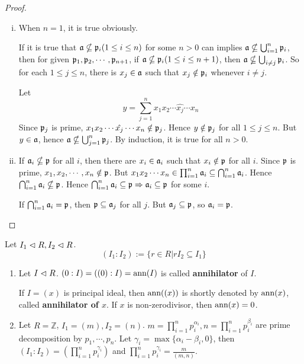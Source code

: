 \documentclass{amsart}
\begin{document}
\begin{proof}
	\begin{enumerate}[(i)]
		\item When $n=1$, it is true obviously.
		
		If it is true that $\mathfrak{a} \nsubseteq \mathfrak{p}_i(1 \leq i \leq n)$ for some $n > 0$ can implies $\mathfrak{a} \nsubseteq \bigcup_{i=1}^{n} \mathfrak{p}_i$, then for given $\mathfrak{p}_1, \mathfrak{p}_2, \cdots, \mathfrak{p}_{n+1}$, if $\mathfrak{a} \nsubseteq \mathfrak{p}_i (1\leq i \leq n+1)$, then $\mathfrak{a} \nsubseteq \bigcup_{i \neq j} \mathfrak{p}_i$. So for each $1\leq j \leq n$, there is $x_j \in \mathfrak{a}$ such that $x_j \notin \mathfrak{p}_i$ whenever $i \neq j$.
		
		Let
		\[
		y = \sum_{j=1}^n x_1 x_2 \cdots \hat{x_j} \cdots x_n
		\]
		Since $\mathfrak{p}_j$ is prime, $x_1 x_2 \cdots \hat{x_j} \cdots x_n \notin \mathfrak{p}_j$. Hence $y \notin \mathfrak{p}_j$ for all $1 \leq j \leq n$. But $y \in \mathfrak{a}$, hence $\mathfrak{a} \nsubseteq \bigcup_{j=1}^n \mathfrak{p}_j$. By induction, it is true for all $n >0$.
		
		\item If $\mathfrak{a}_i \nsubseteq \mathfrak{p}$ for all $i$, then there are $x_i \in \mathfrak{a}_i$ such that $x_i \notin \mathfrak{p}$ for all $i$. Since $\mathfrak{p}$ is prime, $x_1,x_2, \cdots, x_n \notin \mathfrak{p}$. But $x_1 x_2 \cdots x_n \in \prod_{i=1}^{n} \mathfrak{a}_i \subseteq \bigcap_{i=1}^{n} \mathfrak{a}_i$. Hence $\bigcap_{i=1}^n \mathfrak{a}_i \nsubseteq \mathfrak{p}$. Hence $\bigcap_{i=1}^n \mathfrak{a}_i \subseteq \mathfrak{p} \Rightarrow \mathfrak{a}_i \subseteq \mathfrak{p}$ for some $i$.
		
		If $\bigcap_{i=1}^{n} \mathfrak{a}_i = \mathfrak{p}$, then $\mathfrak{p} \subseteq \mathfrak{a}_j$ for all $j$. But $\mathfrak{a}_j \subseteq \mathfrak{p}$, so $\mathfrak{a}_i = \mathfrak{p}$.
	\end{enumerate}
\end{proof}

Let $I_1 \vartriangleleft R, I_2 \vartriangleleft R$.
\[
(I_1: I_2) := \big\{ r \in R| rI_2 \subseteq I_1\}
\]
\begin{ex}
	\begin{enumerate}[1)]
		\item Let $I \vartriangleleft R$. $(0: I)=((0):I)=\text{ann}(I)$ is called \textbf{annihilator} of $I$.
		
		If $I=(x)$ is principal ideal, then $\text{ann}((x))$ is shortly denoted by $\text{ann}(x)$, called \textbf{annihilator of $x$}. If $x$ is non-zerodivisor, then $\text{ann}(x) =0$.
		\item Let $R= \mathbb{Z}$, $I_1=(m), I_2=(n)$. $m= \prod_{i=1}^{n} p_i^{\alpha_i}, n = \prod_{i=1}^{n} p_i^{\beta_i}$ are prime decomposition by $p_1, \cdots, p_n$. Let $\gamma_i = \max \{ \alpha_i -\beta_i, 0\}$, then $(I_1: I_2)= ( \prod_{i=1}^{n} p_i^{\gamma_i})$ and $\prod_{i=1}^{n} p_i^{\gamma_i} = \frac{m}{(m,n)}$.
	\end{enumerate}
\end{ex}
\end{document}
